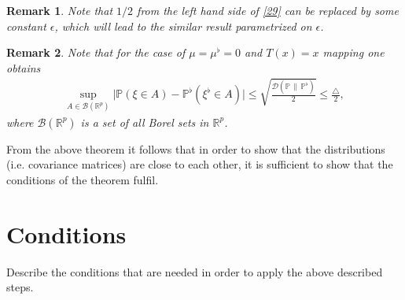 \documentclass[12pt]{article}
\renewcommand{\=}[1]{\stackrel{#1}{=}} %
\providecommand{\e}{\epsilon}
\newtheorem{re}{Remark}[section]
\begin{document}
\begin{re}
Note that $1/2$ from the left hand side of \eqref{29} can be replaced by some constant $\e$, which will lead to the similar result parametrized on $\e$.
\end{re}
\begin{re}
Note that for the case of $\mu = \mu^{\flat} = 0$ and $T(x) = x$ mapping one obtains
\begin{align}
\sup_{A \in \mathcal{B}(\mathbb{R}^p)} \big| \mathbb{P}(\xi \in A) - \mathbb{P}^{\flat}(\xi^{\flat} \in A) \big| \le \sqrt{\frac {\mathcal{D}(\mathbb{P} \, \| \, \mathbb{P}^{\flat})}{2}} \le \frac{\triangle}{2},
\end{align}
where $\mathcal{B}(\mathbb{R}^p)$ is a set of all Borel sets in $\mathbb{R}^p$.
\end{re}
From the above theorem it follows that in order to show that the distributions (i.e. covariance matrices) are close to each other, it is sufficient to show that the conditions of the theorem fulfil. 

\section{Conditions}
Describe the conditions that are needed in order to apply the above described steps.

\newpage
\end{document}
